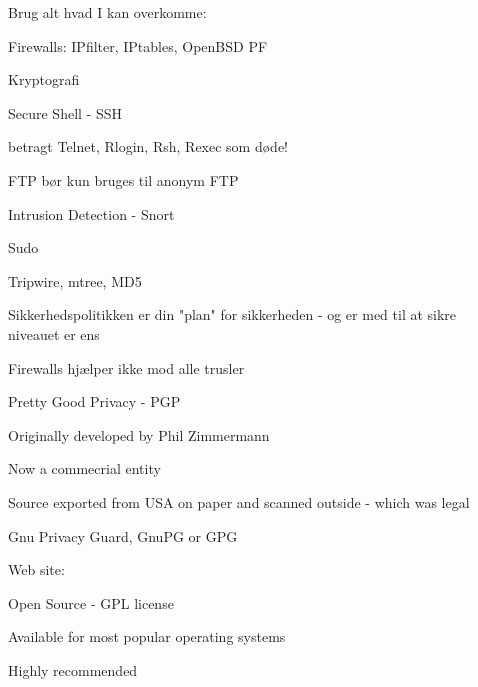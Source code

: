 \documentclass[20pt,landscape,a4paper,footrule]{foils}
\begin{document}
\begin{list1}
\item Brug alt hvad I kan overkomme:
\begin{list2}
\item Firewalls: IPfilter, IPtables, OpenBSD PF
\item Kryptografi 
\item Secure Shell - SSH
\item betragt Telnet, Rlogin, Rsh, Rexec som døde!
\item FTP bør kun bruges til anonym FTP
\item Intrusion Detection - Snort
\item Sudo
\item Tripwire, mtree, MD5
\end{list2}
\item Sikkerhedspolitikken er din "plan" for sikkerheden
- og er med til at sikre niveauet er ens
\item Firewalls hjælper ikke mod alle trusler
\end{list1}










\begin{list2}
\item Pretty Good Privacy - PGP 
\item Originally developed by Phil Zimmermann 
\item Now a commecrial entity 
\item Source exported from USA on paper and scanned outside - which was legal 
\item {}
\end{list2}



\begin{list1}
\item Gnu Privacy Guard, GnuPG or GPG
\item Web site:
\item Open Source - GPL license 
\item Available for most popular operating systems
\item Highly recommended
\end{list1}
\end{document}
